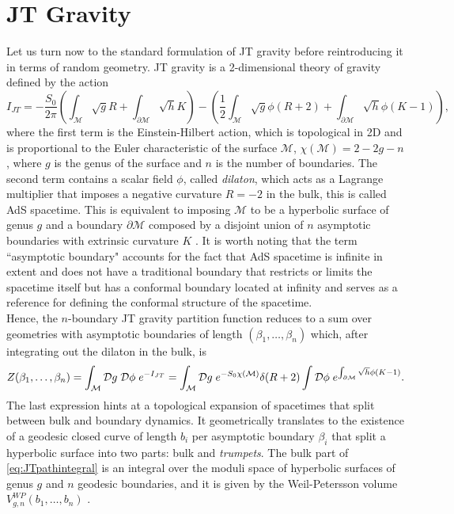 \documentclass[a4paper,11pt]{article}
\begin{document}
\section{JT Gravity}\label{section_JT_random}
Let us turn now to the standard formulation of JT gravity before reintroducing it in terms of random geometry. JT gravity is a 2-dimensional theory of gravity defined by the action 
\begin{equation}
    I_{JT}=-\frac{S_0}{2\pi}\left(\int_\mathcal{M}\sqrt{g}R+\int_{\partial\mathcal{M}}\sqrt{h}K\right)-\left(\frac{1}{2}\int_\mathcal{M}\sqrt{g} \phi (R+2) +\int_{\partial\mathcal{M}} \sqrt{h} \phi (K-1)\right)\label{eq:JTaction},
\end{equation}
where the first term is the Einstein-Hilbert action, which is topological in 2D and is proportional to the Euler characteristic of the surface $\mathcal{M}$, $\chi(\mathcal{M})=2-2g-n$, where $g$ is the genus of the surface and $n$ is the number of boundaries. The second term contains a scalar field $\phi$, called \textit{dilaton}, which acts as a Lagrange multiplier that imposes a negative curvature $R=-2$ in the bulk, this is called AdS spacetime. This is equivalent to imposing $\mathcal{M}$ to be a hyperbolic surface of genus $g$ and a boundary $\partial \mathcal{M}$ composed by a disjoint union of $n$ asymptotic boundaries with extrinsic curvature $K$ \cite{Saad:2019lba}. It is worth noting that the term ``asymptotic boundary" accounts for the fact that AdS spacetime is infinite in extent and does not have a traditional boundary that restricts or limits the spacetime itself but has a conformal boundary located at infinity and serves as a reference for defining the conformal structure of the spacetime.\\
Hence, the $n$-boundary JT gravity partition function reduces to a sum over geometries with asymptotic boundaries of length $(\beta_1,\dots, \beta_n)$ which, after integrating out the dilaton in the bulk, is
\begin{equation}
    Z(\beta_1,\dots,\beta_n)=\int_\mathcal{M} \mathcal{D}g\hspace{1mm}\mathcal{D}\phi \hspace{1mm} e^{-I_{JT}}= \int_{\mathcal{M}}
  \mathcal{D}g \hspace{1mm} e^{-S_0 \chi(\mathcal{M})} \delta(R+2) \int\mathcal{D}\phi \hspace{1mm} e^{\int_{\partial\mathcal{M}} \sqrt{h} \phi (K-1)}.\label{eq:JTpathintegral}
\end{equation}
The last expression hints at a topological expansion of spacetimes that split between bulk and boundary dynamics. It geometrically translates to the existence of a geodesic closed curve of length $b_i$ per asymptotic boundary $\beta_i$ that split a hyperbolic surface into two parts: bulk and \textit{trumpets}. The bulk part of \eqref{eq:JTpathintegral} is an integral over the moduli space of hyperbolic surfaces of genus $g$ and $n$ geodesic boundaries, and it is given by the Weil-Petersson volume $V^{WP}_{g,n}(b_1,\dots,b_n)$ \cite{Mirzakhani}. 
\end{document}
